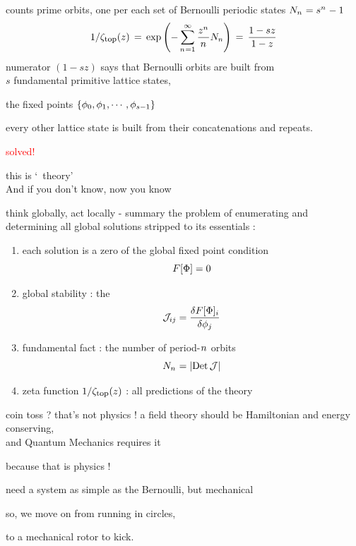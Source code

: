 \begin{frame}{\tzeta}
counts {\color{blue}prime orbits},
one per each set of Bernoulli periodic states $N_{n_{}}=s^{{n_{}}} - 1$
\[
1/\zeta_{\mbox{\footnotesize top}} (z)
 \,=\,  \exp \left(-\sum_{{n_{}}=1}^\infty
\frac{z^{n_{}}}{{n_{}}} N_n
         \right)
\,=\,
\frac{1 -  {s}z}{1 - z}
\] %
numerator $(1 - {s}z)$ says that Bernoulli orbits are built from \\
$s$
fundamental {\color{blue}primitive} lattice states,

\hfill
the fixed points
$\{\phi_0,\phi_1,\cdots,\phi_{s-1}\}$
\medskip

every other lattice state is
built from their concatenations and repeats.

\vfill
\hfill {\Huge \textcolor{red}{solved!}}
\vfill

{\color{blue}this is `\po\ theory'}
\\
 And if you don't know,
 {now you know}

\end{frame}

\begin{frame}{think globally, act locally - summary}
\bigskip
the problem of enumerating and determining all global solutions stripped
to its essentials :
\bigskip
\begin{enumerate}
              \item
each solution is a zero of the global {\color{blue}fixed point} condition
\[
F[\Phi] = 0
\]
              \item
{\color{blue}global stability} :  the {\jacobianOrb}
\[
{\cal J}_{ij} =\frac{\delta F[\Phi]_i}{\delta \phi_j}
\]
              \item
{\color{blue}fundamental fact} : the number of period-${n_{}}$ orbits
\[
N_{n_{}} = |\mbox{\rm Det}\,{\cal J}|
\]

              \item
{\color{blue}zeta function} $1/\zeta_{\mbox{\footnotesize top}} (z)$ : all predictions of the theory
            \end{enumerate}
\end{frame}

\begin{frame}{coin toss ? that's not physics !}
a field theory should be
Hamiltonian and energy conserving, \\
and Quantum Mechanics requires it

\hfill
because {\color{blue}that is physics} {\color{red}!}
\bigskip

need a system as simple
as the Bernoulli, but {\color{blue}mechanical}
\bigskip

so, we move on from running in circles,

\hfill
to a mechanical {\color{blue}rotor} to kick.
\end{frame}

